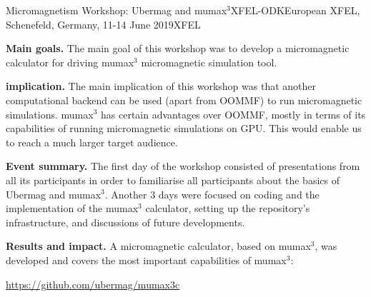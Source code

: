 \begin{event}{Micromagnetism Workshop: Ubermag and mumax$^{3}$}{XFEL-ODK}{European XFEL, Schenefeld, Germany, 11-14 June 2019}{XFEL}{}{}{}

\textbf{Main goals.} The main goal of this workshop was to develop a
micromagnetic calculator for driving mumax$^{3}$ micromagnetic
simulation tool.

\textbf{\ODK implication.} The main implication of this workshop was
that another computational backend can be used (apart from OOMMF) to
run micromagnetic simulations. mumax$^{3}$ has certain advantages over
OOMMF, mostly in terms of its capabilities of running micromagnetic
simulations on GPU. This would enable us to reach a much larger target
audience.

\textbf{Event summary.} The first day of the workshop consisted of
presentations from all its participants in order to familiarise all
participants about the basics of Ubermag and mumax$^{3}$. Another 3
days were focused on coding and the implementation of the mumax$^{3}$
calculator, setting up the repository's infrastructure, and
discussions of future developments.

\textbf{Results and impact.} A micromagnetic calculator, based on
mumax$^{3}$, was developed and covers the most important capabilities
of mumax$^{3}$:

\centerline{\url{https://github.com/ubermag/mumax3c}}

\end{event}
